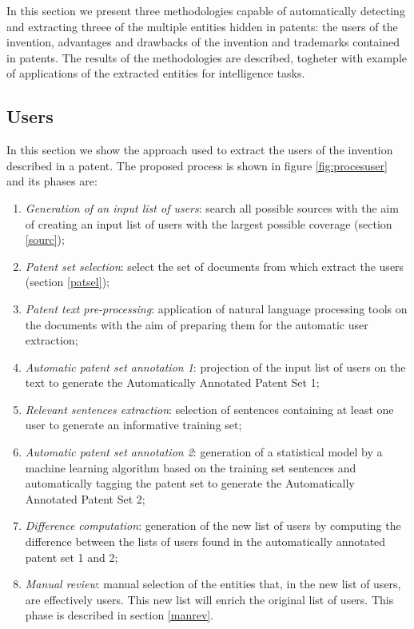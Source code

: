 \documentclass[]{book}
\begin{document}
In this section we present three methodologies capable of automatically
detecting and extracting threee of the multiple entities hidden in
patents: the users of the invention, advantages and drawbacks of the
invention and trademarks contained in patents. The results of the
methodologies are described, togheter with example of applications of
the extracted entities for intelligence tasks.

\subsection{Users}\label{usersresults}

In this section we show the approach used to extract the users of the
invention described in a patent. The proposed process is shown in figure
\ref{fig:procesuser} and its phases are:

\begin{enumerate}
\def\labelenumi{\arabic{enumi}.}
\item
  \emph{Generation of an input list of users}: search all possible
  sources with the aim of creating an input list of users with the
  largest possible coverage (section \ref{sourc});
\item
  \emph{Patent set selection}: select the set of documents from which
  extract the users (section \ref{patsel});
\item
  \emph{Patent text pre-processing}: application of natural language
  processing tools on the documents with the aim of preparing them for
  the automatic user extraction;
\item
  \emph{Automatic patent set annotation 1}: projection of the input list
  of users on the text to generate the Automatically Annotated Patent
  Set 1;
\item
  \emph{Relevant sentences extraction}: selection of sentences
  containing at least one user to generate an informative training set;
\item
  \emph{Automatic patent set annotation 2}: generation of a statistical
  model by a machine learning algorithm based on the training set
  sentences and automatically tagging the patent set to generate the
  Automatically Annotated Patent Set 2;
\item
  \emph{Difference computation}: generation of the new list of users by
  computing the difference between the lists of users found in the
  automatically annotated patent set 1 and 2;
\item
  \emph{Manual review}: manual selection of the entities that, in the
  new list of users, are effectively users. This new list will enrich
  the original list of users. This phase is described in section
  \ref{manrev}.
\end{enumerate}
\end{document}
